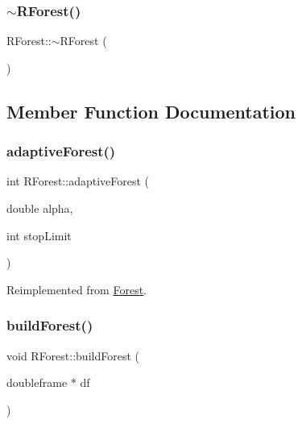 \mbox{\label{classRForest_a873a1b941163b4cccda4bf83607226f3}} 
\subsubsection{\texorpdfstring{$\sim$\+R\+Forest()}{~RForest()}}
{\footnotesize\ttfamily R\+Forest\+::$\sim$\+R\+Forest (\begin{DoxyParamCaption}{ }\end{DoxyParamCaption})\hspace{0.3cm}{\ttfamily [inline]}}



\subsection{Member Function Documentation}
\mbox{\label{classRForest_abc389cab7fa7ffee669b3add5aad4c52}} 
\subsubsection{\texorpdfstring{adaptive\+Forest()}{adaptiveForest()}}
{\footnotesize\ttfamily int R\+Forest\+::adaptive\+Forest (\begin{DoxyParamCaption}\item[{double}]{alpha,  }\item[{int}]{stop\+Limit }\end{DoxyParamCaption})\hspace{0.3cm}{\ttfamily [virtual]}}



Reimplemented from \hyperlink{classForest_a825bb350730c50aa8924e9f761c4a2a4}{Forest}.

\mbox{\label{classRForest_a7e8959b5b54b454f34ed68d60132e80f}} 
\subsubsection{\texorpdfstring{build\+Forest()}{buildForest()}}
{\footnotesize\ttfamily void R\+Forest\+::build\+Forest (\begin{DoxyParamCaption}\item[{doubleframe $\ast$}]{df }\end{DoxyParamCaption})}

